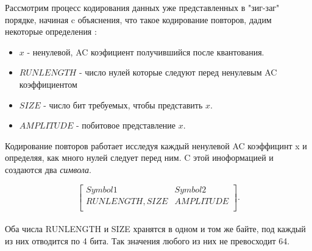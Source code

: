 \documentclass{matmex-diploma-custom}
\begin{document}
Рассмотрим процесс кодирования данных уже представленных в "зиг-заг" порядке, начиная c объяснения, что такое кодирование повторов, дадим некоторые определения :


\begin{itemize}
    \item{
        $x$ - ненулевой, AC коэфициент получившийся после квантования.
    }
    \item{
        $RUNLENGTH$ - число нулей которые следуют перед ненулевым AC коэффициентом
    }
     \item{
        $SIZE$ - число бит требуемых, чтобы представить $x$.
     }
    \item{
        $AMPLITUDE$ - побитовое представление $x$.
    }
\end{itemize}

Кодирование повторов работает исследуя каждый  ненулевой AC коэффицинт x и определяя, как много нулей следует перед ним. C этой иноформацией и создаются два \emph{символа}.


  $$ \begin{bmatrix}
        Symbol 1 & Symbol 2 \\
        RUNLENGTH, SIZE& AMPLITUDE\\

       \end{bmatrix}. $$\\

  Оба числа RUNLENGTH и SIZE  хранятся в одном и том же байте, под каждый из них отводится по 4 бита. Так значения любого из них не превосходит 64.

\end{document}
